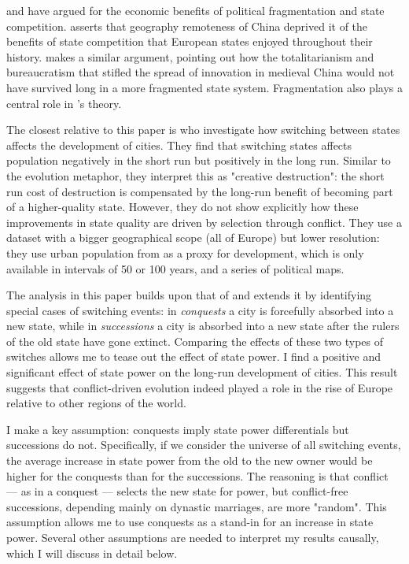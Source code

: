 \documentclass{article}
\begin{document}
\cite{diamond1997} and \cite{landes1969, landes2006} have argued for the economic benefits of political fragmentation and state competition. \cite{diamond1997} asserts that geography 
remoteness of China deprived it of the benefits of state competition that European states enjoyed throughout their history. \cite{landes2006} makes a similar argument, pointing out how the totalitarianism and bureaucratism that stifled the spread of innovation in medieval China would not have survived long in a more fragmented state system. Fragmentation also plays a central role in \cite{cervellati2022}'s theory.

The closest relative to this paper is \cite{schoenholzer2022} who investigate how switching between states affects the development of cities. They find that switching states affects population negatively in the short run but positively in the long run. Similar to the evolution metaphor, they interpret this as "creative destruction": the short run cost of destruction is compensated by the long-run benefit of becoming part of a higher-quality state. However, they do not show explicitly how these improvements in state quality are driven by selection through conflict. They use a dataset with a bigger geographical scope (all of Europe) but lower resolution: they use urban population from \cite{bairoch1988} as a proxy for development, which is only available in intervals of 50 or 100 years, and a series of political maps. 


The analysis in this paper builds upon that of \cite{schoenholzer2022} and extends it by identifying special cases of switching events: in \textit{conquests} a city is forcefully absorbed into a new state, while in \textit{successions} a city is absorbed into a new state after the rulers of the old state have gone extinct. Comparing the effects of these two types of switches allows me to tease out the effect of state power. I find a positive and significant effect of state power on the long-run development of cities. This result suggests that conflict-driven evolution indeed played a role in the rise of Europe relative to other regions of the world.

I make a key assumption: conquests imply state power differentials but successions do not. Specifically, if we consider the universe of all switching events, the average increase in state power from the old to the new owner would be higher for the conquests than for the successions. The reasoning is that conflict --- as in a conquest --- selects the new state for power, but conflict-free successions, depending mainly on dynastic marriages, are more "random". This assumption allows me to use conquests as a stand-in for an increase in state power. Several other assumptions are needed to interpret my results causally, which I will discuss in detail below.
\end{document}
